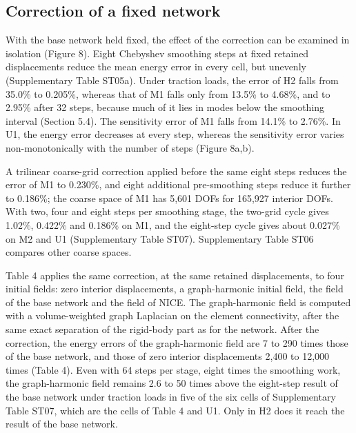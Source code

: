 \documentclass[preprint,12pt,authoryear]{elsarticle}
\begin{document}
\subsection{Correction of a fixed network}

With the base network held fixed, the effect of the correction can be examined in isolation (Figure 8). Eight Chebyshev smoothing steps at fixed retained displacements reduce the mean energy error in every cell, but unevenly (Supplementary Table ST05a). Under traction loads, the error of H2 falls from 35.0\% to 0.205\%, whereas that of M1 falls only from 13.5\% to 4.68\%, and to 2.95\% after 32 steps, because much of it lies in modes below the smoothing interval (Section 5.4). The sensitivity error of M1 falls from 14.1\% to 2.76\%. In U1, the energy error decreases at every step, whereas the sensitivity error varies non-monotonically with the number of steps (Figure 8a,b).

A trilinear coarse-grid correction applied before the same eight steps reduces the error of M1 to 0.230\%, and eight additional pre-smoothing steps reduce it further to 0.186\%; the coarse space of M1 has 5,601 DOFs for 165,927 interior DOFs. With two, four and eight steps per smoothing stage, the two-grid cycle gives 1.02\%, 0.422\% and 0.186\% on M1, and the eight-step cycle gives about 0.027\% on M2 and U1 (Supplementary Table ST07). Supplementary Table ST06 compares other coarse spaces.

Table 4 applies the same correction, at the same retained displacements, to four initial fields: zero interior displacements, a graph-harmonic initial field, the field of the base network and the field of NICE. The graph-harmonic field is computed with a volume-weighted graph Laplacian on the element connectivity, after the same exact separation of the rigid-body part as for the network. After the correction, the energy errors of the graph-harmonic field are 7 to 290 times those of the base network, and those of zero interior displacements 2,400 to 12,000 times (Table 4). Even with 64 steps per stage, eight times the smoothing work, the graph-harmonic field remains 2.6 to 50 times above the eight-step result of the base network under traction loads in five of the six cells of Supplementary Table ST07, which are the cells of Table 4 and U1. Only in H2 does it reach the result of the base network.
\end{document}
